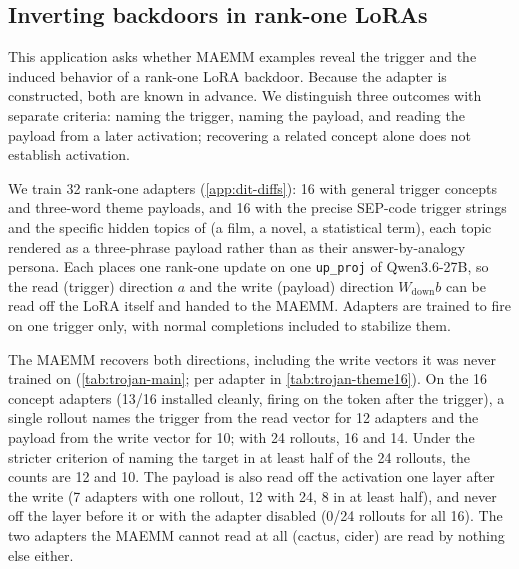\subsection{Inverting backdoors in rank-one LoRAs}
\label{sec:backdoors}
This application asks whether MAEMM examples reveal the trigger and the induced behavior of a rank-one LoRA backdoor. Because the adapter is constructed, both are known in advance. We distinguish three outcomes with separate criteria: naming the trigger, naming the payload, and reading the payload from a later activation; recovering a related concept alone does not establish activation.

We train 32 rank-one adapters (\cref{app:dit-diffs}): 16 with general trigger concepts and three-word theme payloads, and 16 with the precise SEP-code trigger strings and the specific hidden topics of \citet{goel2026dit} (a film, a novel, a statistical term), each topic rendered as a three-phrase payload rather than as their answer-by-analogy persona. Each places one rank-one update on one \texttt{up\_proj} of Qwen3.6-27B, so the read (trigger) direction $a$ and the write (payload) direction $W_{\mathrm{down}}b$ can be read off the LoRA itself and handed to the MAEMM. Adapters are trained to fire on one trigger only, with normal completions included to stabilize them.

The MAEMM recovers both directions, including the write vectors it was never trained on (\cref{tab:trojan-main}; per adapter in \cref{tab:trojan-theme16}). On the 16 concept adapters (13/16 installed cleanly, firing on the token after the trigger), a single rollout names the trigger from the read vector for 12 adapters and the payload from the write vector for 10; with 24 rollouts, 16 and 14. Under the stricter criterion of naming the target in at least half of the 24 rollouts, the counts are 12 and 10. The payload is also read off the activation one layer after the write (7 adapters with one rollout, 12 with 24, 8 in at least half), and never off the layer before it or with the adapter disabled (0/24 rollouts for all 16). The two adapters the MAEMM cannot read at all (cactus, cider) are read by nothing else either.

